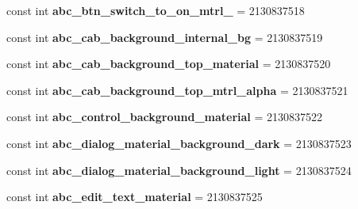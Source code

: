 \begin{DoxyCompactItemize}
\item 
\hypertarget{classClient_1_1Droid_1_1Resource_1_1Drawable_ad04a0bdf8c44bcfc17bfe5e6b8d4c809}{}const int {\bfseries abc\+\_\+btn\+\_\+switch\+\_\+to\+\_\+on\+\_\+mtrl\+\_} = 2130837518\label{classClient_1_1Droid_1_1Resource_1_1Drawable_ad04a0bdf8c44bcfc17bfe5e6b8d4c809}

\item 
\hypertarget{classClient_1_1Droid_1_1Resource_1_1Drawable_ac5189b05f95e1c4d1a653242b918393b}{}const int {\bfseries abc\+\_\+cab\+\_\+background\+\_\+internal\+\_\+bg} = 2130837519\label{classClient_1_1Droid_1_1Resource_1_1Drawable_ac5189b05f95e1c4d1a653242b918393b}

\item 
\hypertarget{classClient_1_1Droid_1_1Resource_1_1Drawable_a96b40a263d709b255c05c43da005bd52}{}const int {\bfseries abc\+\_\+cab\+\_\+background\+\_\+top\+\_\+material} = 2130837520\label{classClient_1_1Droid_1_1Resource_1_1Drawable_a96b40a263d709b255c05c43da005bd52}

\item 
\hypertarget{classClient_1_1Droid_1_1Resource_1_1Drawable_a12151ad4d31e38d3cfb556f8cec4471e}{}const int {\bfseries abc\+\_\+cab\+\_\+background\+\_\+top\+\_\+mtrl\+\_\+alpha} = 2130837521\label{classClient_1_1Droid_1_1Resource_1_1Drawable_a12151ad4d31e38d3cfb556f8cec4471e}

\item 
\hypertarget{classClient_1_1Droid_1_1Resource_1_1Drawable_a69b0d710cffa02fc6aa36c6376e6b086}{}const int {\bfseries abc\+\_\+control\+\_\+background\+\_\+material} = 2130837522\label{classClient_1_1Droid_1_1Resource_1_1Drawable_a69b0d710cffa02fc6aa36c6376e6b086}

\item 
\hypertarget{classClient_1_1Droid_1_1Resource_1_1Drawable_a357e6db0bb9b79889201479b452b96da}{}const int {\bfseries abc\+\_\+dialog\+\_\+material\+\_\+background\+\_\+dark} = 2130837523\label{classClient_1_1Droid_1_1Resource_1_1Drawable_a357e6db0bb9b79889201479b452b96da}

\item 
\hypertarget{classClient_1_1Droid_1_1Resource_1_1Drawable_a65145bddc6d1ace50bb38afbbb9d3e25}{}const int {\bfseries abc\+\_\+dialog\+\_\+material\+\_\+background\+\_\+light} = 2130837524\label{classClient_1_1Droid_1_1Resource_1_1Drawable_a65145bddc6d1ace50bb38afbbb9d3e25}

\item 
\hypertarget{classClient_1_1Droid_1_1Resource_1_1Drawable_a2d9859be25004b9c4cc060a665638126}{}const int {\bfseries abc\+\_\+edit\+\_\+text\+\_\+material} = 2130837525\label{classClient_1_1Droid_1_1Resource_1_1Drawable_a2d9859be25004b9c4cc060a665638126}


\end{DoxyCompactItemize}
